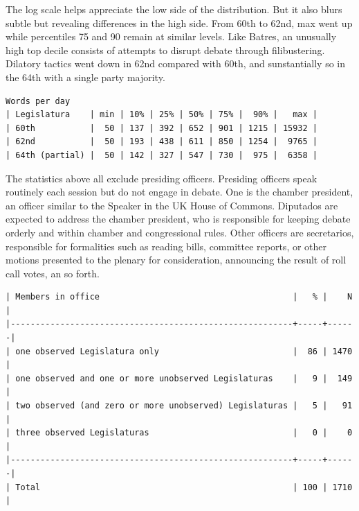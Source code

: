 \documentclass[letter,12pt]{article}
\begin{document}

The log scale helps appreciate the low side of the distribution. But it also blurs subtle but revealing differences in the high side. From 60th to 62nd, max went up while percentiles 75 and 90 remain at similar levels. Like Batres, an unusually high top decile consists of attempts to disrupt debate through filibustering. Dilatory tactics went down in 62nd compared with 60th, and sunstantially so in the 64th with a single party majority.

\singlespacing
\begin{footnotesize}
\begin{verbatim}
Words per day
| Legislatura    | min | 10% | 25% | 50% | 75% |  90% |   max |
| 60th           |  50 | 137 | 392 | 652 | 901 | 1215 | 15932 |
| 62nd           |  50 | 193 | 438 | 611 | 850 | 1254 |  9765 |
| 64th (partial) |  50 | 142 | 327 | 547 | 730 |  975 |  6358 |
\end{verbatim}
\end{footnotesize}
\doublespacing

The statistics above all exclude presiding officers. Presiding officers speak routinely each session but do not engage in debate. One is the chamber president, an officer similar to the Speaker in the UK House of Commons. Diputados are expected to address the chamber president, who is responsible for keeping debate orderly and within chamber and congressional rules. Other officers are secretarios, responsible for formalities such as reading bills, committee reports, or other motions presented to the plenary for consideration, announcing the result of roll call votes, an so forth.  

\singlespacing
\begin{footnotesize}
\begin{verbatim}
| Members in office                                       |   % |    N |
|---------------------------------------------------------+-----+------|
| one observed Legislatura only                           |  86 | 1470 |
| one observed and one or more unobserved Legislaturas    |   9 |  149 |
| two observed (and zero or more unobserved) Legislaturas |   5 |   91 |
| three observed Legislaturas                             |   0 |    0 |
|---------------------------------------------------------+-----+------|
| Total                                                   | 100 | 1710 |
\end{verbatim}
\end{footnotesize}
\doublespacing
\end{document}
